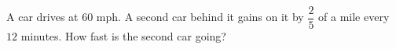 A car drives at $60$ mph. A second car behind it gains on it by $\dfrac{2}{5}$ of a mile every $12$ minutes. How fast is the second car going?
